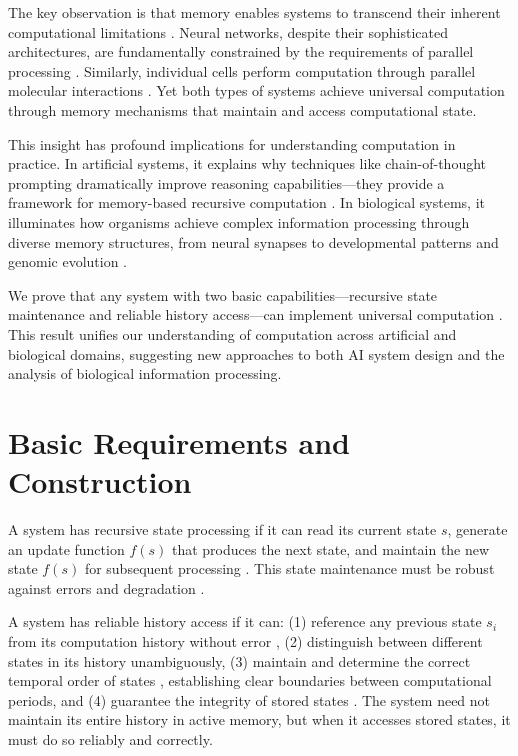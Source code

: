 \documentclass[12pt]{article}
\begin{document}
The key observation is that memory enables systems to transcend their inherent computational limitations \cite{barrett2019analyzing,ganguli2018intertwined}. Neural networks, despite their sophisticated architectures, are fundamentally constrained by the requirements of parallel processing \cite{cai2024efficient}. Similarly, individual cells perform computation through parallel molecular interactions \cite{fu2023scgrn,hoel2020emergence}. Yet both types of systems achieve universal computation through memory mechanisms that maintain and access computational state.

This insight has profound implications for understanding computation in practice. In artificial systems, it explains why techniques like chain-of-thought prompting dramatically improve reasoning capabilities---they provide a framework for memory-based recursive computation \cite{wei2022chain,dickson2024trust,ahn2024recursive}. In biological systems, it illuminates how organisms achieve complex information processing through diverse memory structures, from neural synapses to developmental patterns and genomic evolution \cite{burrill2010making,espinosa2024molecular}.

We prove that any system with two basic capabilities---recursive state maintenance and reliable history access---can implement universal computation \cite{bennett1989time,boyle2024memory}. This result unifies our understanding of computation across artificial and biological domains, suggesting new approaches to both AI system design and the analysis of biological information processing.

\section{Basic Requirements and Construction}

A system has recursive state processing if it can read its current state $s$, generate an update function $f(s)$ that produces the next state, and maintain the new state $f(s)$ for subsequent processing \cite{manuri2019state}. This state maintenance must be robust against errors and degradation \cite{yang2013survey}.

A system has reliable history access if it can: (1) reference any previous state $s_i$ from its computation history without error \cite{fu2024memory}, (2) distinguish between different states in its history unambiguously, (3) maintain and determine the correct temporal order of states \cite{berridge2014cell,pastor2020computation}, establishing clear boundaries between computational periods, and (4) guarantee the integrity of stored states \cite{lovkvist2021using}. The system need not maintain its entire history in active memory, but when it accesses stored states, it must do so reliably and correctly.
\end{document}
